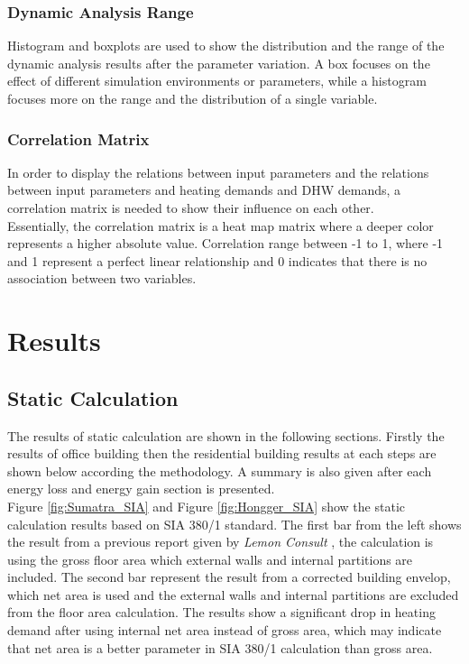 \documentclass[a4paper, oneside]{discothesis}
\begin{document}
		\subsection{Dynamic Analysis Range}
			Histogram and boxplots are used to show the distribution and the range of the dynamic analysis results after the parameter variation. A box focuses on the effect of different simulation environments or parameters, while a histogram focuses more on the range and the distribution of a single variable.

		\subsection{Correlation Matrix}
			In order to display the relations between input parameters and the relations between input parameters and heating demands and DHW demands, a correlation matrix is needed to show their influence on each other. \\
			Essentially, the correlation matrix is a heat map matrix where a deeper color represents a higher absolute value. Correlation range between -1 to 1, where -1 and 1 represent a perfect linear relationship and 0 indicates that there is no association between two variables.\\
		

\chapter{Results}

	\section{Static Calculation}
		The results of static calculation are shown in the following sections. Firstly the results of office building then the residential building results at each steps are shown below according the methodology. A summary is also given after each energy loss and energy gain section is presented.\\

		Figure \ref{fig:Sumatra_SIA} and Figure \ref{fig:Hongger_SIA} show the static calculation results based on SIA 380/1 standard. The first bar from the left shows the result from a previous report given by \textit{Lemon Consult} \cite{SIAPreviousreport}, the calculation is using the gross floor area which external walls and internal partitions are included. The second bar represent the result from a corrected building envelop, which net area is used and the external walls and internal partitions are excluded from the floor area calculation. The results show a significant drop in heating demand after using internal net area instead of gross area, which may indicate that net area is a better parameter in SIA 380/1 calculation than gross area.\\
\end{document}

